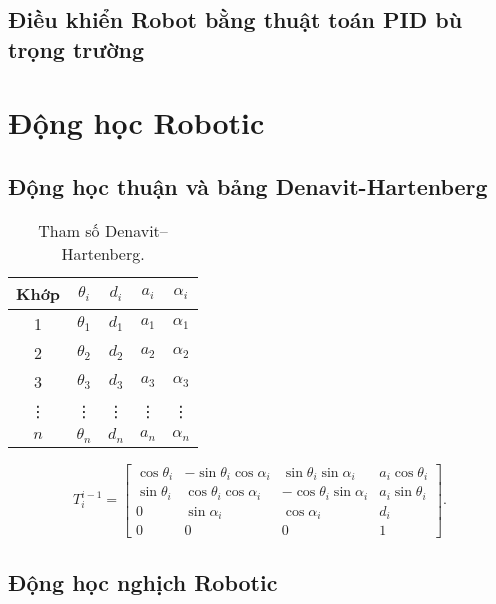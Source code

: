\subsection{Điều khiển Robot bằng thuật toán PID bù trọng trường}

\section{Động học Robotic}

\subsection{Động học thuận và bảng Denavit-Hartenberg}

\begin{table}[h]
    \centering
    \caption{Tham số Denavit–Hartenberg.}
    \begin{tabular}{|c|c|c|c|c|}
        \hline
        \textbf{Khớp} & \( \theta_i \) & \( d_i \) & \( a_i \) & \( \alpha_i \) \\
        \hline
        1 & \( \theta_1 \) & \( d_1 \) & \( a_1 \) & \( \alpha_1 \) \\
        \hline
        2 & \( \theta_2 \) & \( d_2 \) & \( a_2 \) & \( \alpha_2 \) \\
        \hline
        3 & \( \theta_3 \) & \( d_3 \) & \( a_3 \) & \( \alpha_3 \) \\
        \hline
        \vdots & \vdots & \vdots & \vdots & \vdots \\
        \hline
        \( n \) & \( \theta_n \) & \( d_n \) & \( a_n \) & \( \alpha_n \) \\
        \hline
    \end{tabular}
\end{table}

\begin{equation}
    T_i^{i-1} =
    \left[ \begin{array}{cccc}
    \cos\theta_i & -\sin\theta_i \cos\alpha_i & \sin\theta_i \sin\alpha_i & a_i \cos\theta_i \\
    \sin\theta_i & \cos\theta_i \cos\alpha_i & -\cos\theta_i \sin\alpha_i & a_i \sin\theta_i \\
    0 & \sin\alpha_i & \cos\alpha_i & d_i \\
    0 & 0 & 0 & 1
    \end{array} \right].
\end{equation}

\subsection{Động học nghịch Robotic}

